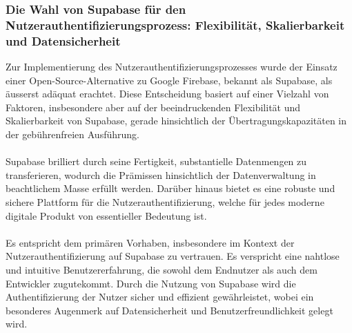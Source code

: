 \subsubsection{Die Wahl von Supabase für den Nutzerauthentifizierungsprozess: Flexibilität, Skalierbarkeit und Datensicherheit}
Zur Implementierung des Nutzerauthentifizierungsprozesses wurde der Einsatz einer Open-Source-Alternative zu Google Firebase, bekannt als Supabase, als äusserst adäquat erachtet. Diese Entscheidung basiert auf einer Vielzahl von Faktoren, insbesondere aber auf der beeindruckenden Flexibilität und Skalierbarkeit von Supabase, gerade hinsichtlich der Übertragungskapazitäten in der gebührenfreien Ausführung.\\\\
Supabase brilliert durch seine Fertigkeit, substantielle Datenmengen zu transferieren, wodurch die Prämissen hinsichtlich der Datenverwaltung in beachtlichem Masse erfüllt werden. Darüber hinaus bietet es eine robuste und sichere Plattform für die Nutzerauthentifizierung, welche für jedes moderne digitale Produkt von essentieller Bedeutung ist.\\\\
Es entspricht dem primären Vorhaben, insbesondere im Kontext der Nutzerauthentifizierung auf Supabase zu vertrauen. Es verspricht eine nahtlose und intuitive Benutzererfahrung, die sowohl dem Endnutzer als auch dem Entwickler zugutekommt. Durch die Nutzung von Supabase wird die Authentifizierung der Nutzer sicher und effizient gewährleistet, wobei ein besonderes Augenmerk auf Datensicherheit und Benutzerfreundlichkeit gelegt wird.
